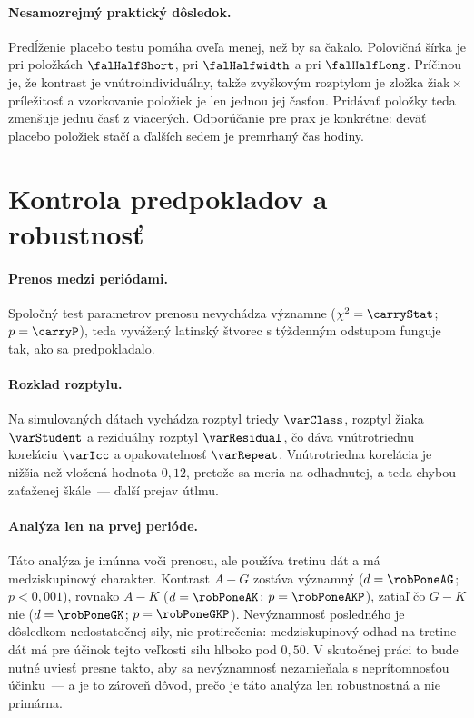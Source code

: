 \paragraph{Nesamozrejmý praktický dôsledok.} Predĺženie placebo testu pomáha oveľa menej, než by sa čakalo. Polovičná šírka je pri \falShortItems{} položkách $\falHalfShort$, pri \falPlacebo{} $\falHalfwidth$ a pri \falLongItems{} $\falHalfLong$. Príčinou je, že kontrast je vnútroindividuálny, takže zvyškovým rozptylom je zložka žiak\,$\times$\,príležitosť a vzorkovanie položiek je len jednou jej časťou. Pridávať položky teda zmenšuje jednu časť z viacerých. Odporúčanie pre prax je konkrétne: deväť placebo položiek stačí a ďalších sedem je premrhaný čas hodiny.


\section{Kontrola predpokladov a robustnosť}

\paragraph{Prenos medzi periódami.} Spoločný test parametrov prenosu nevychádza významne ($\chi^2=\carryStat$; $p=\carryP$), teda vyvážený latinský štvorec s týždenným odstupom funguje tak, ako sa predpokladalo.

\paragraph{Rozklad rozptylu.} Na simulovaných dátach vychádza rozptyl triedy $\varClass$, rozptyl žiaka $\varStudent$ a reziduálny rozptyl $\varResidual$, čo dáva vnútrotriednu koreláciu $\varIcc$ a opakovateľnosť $\varRepeat$. Vnútrotriedna korelácia je nižšia než vložená hodnota $0{,}12$, pretože sa meria na odhadnutej, a teda chybou zaťaženej škále~--- ďalší prejav útlmu.

\paragraph{Analýza len na prvej perióde.} Táto analýza je imúnna voči prenosu, ale používa tretinu dát a má medziskupinový charakter. Kontrast $A-G$ zostáva významný ($d=\robPoneAG$; $p<0{,}001$), rovnako $A-K$ ($d=\robPoneAK$; $p=\robPoneAKP$), zatiaľ čo $G-K$ nie ($d=\robPoneGK$; $p=\robPoneGKP$). Nevýznamnosť posledného je dôsledkom nedostatočnej sily, nie protirečenia: medziskupinový odhad na tretine dát má pre účinok tejto veľkosti silu hlboko pod $0{,}50$. V skutočnej práci to bude nutné uviesť presne takto, aby sa nevýznamnosť nezamieňala s neprítomnosťou účinku~--- a je to zároveň dôvod, prečo je táto analýza len robustnostná a nie primárna.


